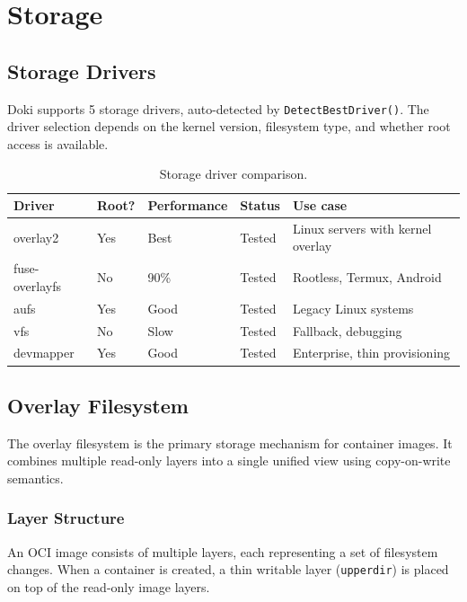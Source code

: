\chapter{Storage}
\label{ch:storage}

\section{Storage Drivers}
\label{sec:storage-drivers}

Doki supports 5 storage drivers, auto-detected by
\texttt{DetectBestDriver()}. The driver selection depends on the
kernel version, filesystem type, and whether root access is available.

\begin{table}[htbp]
  \centering
  \caption{Storage driver comparison.}
  \label{tab:storage-drivers}
  \begin{tabularx}{\textwidth}{l l l l X}
    \toprule
    \textbf{Driver} & \textbf{Root?} & \textbf{Performance} & \textbf{Status} & \textbf{Use case} \\
    \midrule
    overlay2       & Yes & Best   & Tested & Linux servers with kernel overlay \\
    fuse-overlayfs & No  & 90\%   & Tested & Rootless, Termux, Android \\
    aufs           & Yes & Good   & Tested & Legacy Linux systems \\
    vfs            & No  & Slow   & Tested & Fallback, debugging \\
    devmapper      & Yes & Good   & Tested & Enterprise, thin provisioning \\
    \bottomrule
  \end{tabularx}
\end{table}

\section{Overlay Filesystem}
\label{sec:overlay}

The overlay filesystem is the primary storage mechanism for container
images. It combines multiple read-only layers into a single unified
view using copy-on-write semantics.

\subsection{Layer Structure}
\label{sec:layer-structure}

An OCI image consists of multiple layers, each representing a set of
filesystem changes. When a container is created, a thin writable layer
(\texttt{upperdir}) is placed on top of the read-only image layers.

